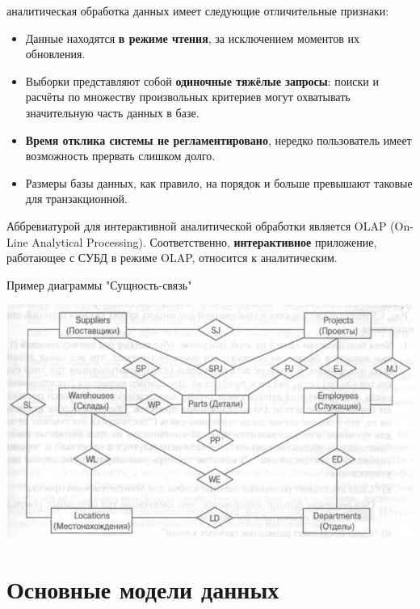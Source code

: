 \documentclass{beamer}
\begin{document}
\begin{frame}
аналитическая обработка данных имеет следующие отличительные признаки:
\begin{itemize}
\item Данные находятся \textbf{в режиме чтения}, за исключением моментов их обновления.
\item Выборки представляют собой \textbf{одиночные тяжёлые запросы}: поиски и расчёты по множеству произвольных критериев могут охватывать значительную часть данных в базе.
\item \textbf{Время отклика системы не регламентировано}, нередко пользователь имеет возможность прервать слишком долго.
\item Размеры базы данных, как правило, на порядок и больше превышают таковые для транзакционной.
\end{itemize}
Аббревиатурой для интерактивной аналитической обработки является OLAP (On-Line Analytical Processing). Соответственно, \textbf{интерактивное} приложение, работающее с СУБД в режиме OLAP, относится к аналитическим.
\end{frame}

\begin{frame}
\begin{block}{Пример диаграммы "Сущность-связь"}
\begin{center}
\includegraphics[scale=0.5]{images/shema-02.png}
\end{center}
\end{block}
\end{frame}

\section{Основные модели данных}
\end{document}
